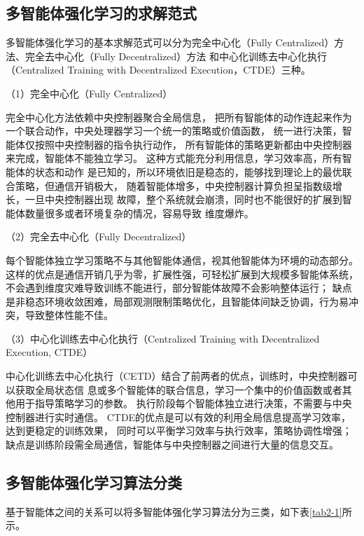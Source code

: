 \subsection{多智能体强化学习的求解范式}
多智能体强化学习的基本求解范式可以分为完全中心化（Fully Centralized）方法、完全去中心化（Fully Decentralized）方法
和中心化训练去中心化执行（Centralized Training with Decentralized Execution，CTDE）三种。



（1）完全中心化（Fully Centralized）

完全中心化方法依赖中央控制器聚合全局信息，
把所有智能体的动作连起来作为一个联合动作，中央处理器学习一个统一的策略或价值函数，
统一进行决策，智能体仅按照中央控制器的指令执行动作，
所有智能体的策略更新都由中央控制器来完成，智能体不能独立学习。
这种方式能充分利用信息，学习效率高，所有智能体的状态和动作
是已知的，所以环境依旧是稳态的，能够找到理论上的最优联合策略，但通信开销极大，
随着智能体增多，中央控制器计算负担呈指数级增长，一旦中央控制器出现
故障，整个系统就会崩溃，同时也不能很好的扩展到智能体数量很多或者环境复杂的情况，容易导致
维度爆炸。

（2）完全去中心化（Fully Decentralized）

每个智能体独立学习策略不与其他智能体通信，视其他智能体为环境的动态部分。
这样的优点是通信开销几乎为零，扩展性强，可轻松扩展到大规模多智能体系统，
不会遇到维度灾难导致训练不能进行，部分智能体故障不会影响整体运行；
缺点是非稳态环境收敛困难，局部观测限制策略优化，且智能体间缺乏协调，行为易冲突，导致整体性能不佳。

（3）中心化训练去中心化执行（Centralized Training with Decentralized Execution, CTDE）

中心化训练去中心化执行（CETD）结合了前两者的优点，训练时，中央控制器可以获取全局状态信
息或多个智能体的联合信息，学习一个集中的价值函数或者其他用于指导策略学习的参数。
执行阶段每个智能体独立进行决策，不需要与中央控制器进行实时通信。
CTDE的优点是可以有效的利用全局信息提高学习效率，达到更稳定的训练效果，
同时可以平衡学习效率与执行效率，策略协调性增强；
缺点是训练阶段需全局通信，智能体与中央控制器之间进行大量的信息交互。

\subsection{多智能体强化学习算法分类}

基于智能体之间的关系可以将多智能体强化学习算法分为三类，如下表\ref{tab2-1}所示。






